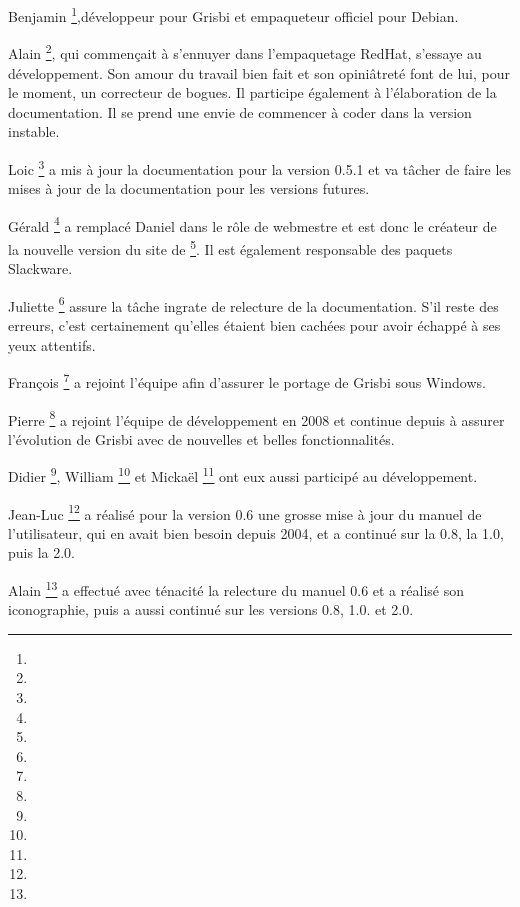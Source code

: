 {Benjamin }\footnote{\urlBenjaminDrieuEmail{}},développeur pour Grisbi et empaqueteur officiel pour \gls{Debian}.

{Alain }\footnote{\urlDionysosEmail{}}, qui commençait à s'ennuyer dans l'empaquetage \gls{RedHat}, s'essaye au développement. Son amour du travail bien fait et son opiniâtreté font de lui, pour le moment, un correcteur de bogues. Il participe également à l'élaboration de la documentation. Il se prend une envie de commencer à coder dans la version instable.

{Loic \footnote{\urlLoicBreillouxEmail{}}} a mis à jour la documentation pour la version 0.5.1 et va tâcher de faire les mises à jour de la documentation pour les versions futures.

{Gérald }\footnote{\urlGeraldNielEmail{}} a remplacé {Daniel } dans le rôle de webmestre et est donc le créateur de la nouvelle version du site de \footnote{\urlGrisbi{}}. Il est
également responsable des paquets \gls{Slackware}.

{Juliette }\footnote{\urlJulietteEmail{}} assure la tâche ingrate de relecture de la documentation. S'il reste des erreurs, c'est certainement qu'elles étaient bien cachées pour avoir échappé à ses yeux attentifs.

{François }\footnote{\urlFrancoisTerrotEmail{}} a rejoint l'équipe afin d'assurer le \gls{portage} de Grisbi sous Windows.

{Pierre }\footnote{\urlPierreBiavaEmail{}} a rejoint l'équipe de développement en 2008 et continue depuis à assurer l'évolution de Grisbi avec de nouvelles et belles fonctionnalités.

{Didier }\footnote{\urlDidierChevalierEmail{}},  {William }\footnote{\urlWilliamOllivierEmail{}} et {Mickaël }\footnote{\urlMickaelRemarsEmail{}} ont eux aussi participé au développement.

{Jean-Luc }\footnote{\urlJeanLucDuflotEmail{}} a réalisé pour la version 0.6 une grosse mise à jour du manuel de l'utilisateur, qui en avait bien besoin depuis 2004, et a continué sur la 0.8, la 1.0, puis la 2.0.

{Alain }\footnote{\urlAlainLetientEmail{}} a effectué avec ténacité la relecture du manuel 0.6 et a réalisé son iconographie, puis a aussi continué sur les versions 0.8, 1.0. et 2.0.

